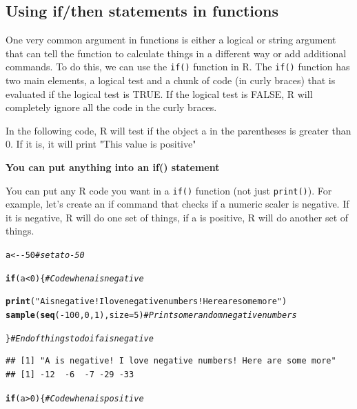 \documentclass{tufte-book}\usepackage[]{graphicx}\usepackage[]{color}
\makeatletter
\newcommand{\hlnum}[1]{\textcolor[rgb]{0.686,0.059,0.569}{#1}}%
\newcommand{\hlstr}[1]{\textcolor[rgb]{0.192,0.494,0.8}{#1}}%
\newcommand{\hlcom}[1]{\textcolor[rgb]{0.678,0.584,0.686}{\textit{#1}}}%
\newcommand{\hlopt}[1]{\textcolor[rgb]{0,0,0}{#1}}%
\newcommand{\hlstd}[1]{\textcolor[rgb]{0.345,0.345,0.345}{#1}}%
\newcommand{\hlkwa}[1]{\textcolor[rgb]{0.161,0.373,0.58}{\textbf{#1}}}%
\newcommand{\hlkwb}[1]{\textcolor[rgb]{0.69,0.353,0.396}{#1}}%
\newcommand{\hlkwc}[1]{\textcolor[rgb]{0.333,0.667,0.333}{#1}}%
\newcommand{\hlkwd}[1]{\textcolor[rgb]{0.737,0.353,0.396}{\textbf{#1}}}%
\newenvironment{kframe}{%
 \def\at@end@of@kframe{}%
 \ifinner\ifhmode%
  \def\at@end@of@kframe{\end{minipage}}%
  \begin{minipage}{\columnwidth}%
 \fi\fi%
 \def\FrameCommand##1{\hskip\@totalleftmargin \hskip-\fboxsep
 \colorbox{shadecolor}{##1}\hskip-\fboxsep
     \hskip-\linewidth \hskip-\@totalleftmargin \hskip\columnwidth}%
 \MakeFramed {\advance\hsize-\width
   \@totalleftmargin\z@ \linewidth\hsize
   \@setminipage}}%
 {\par\unskip\endMakeFramed%
 \at@end@of@kframe}
\newenvironment{knitrout}{}{} %
\makeatother
\begin{document}
\begin{footnotesize}
\subsection{Using if/then statements in functions}

One very common argument in functions is either a logical or string argument that can tell the function to calculate things in a different way or add additional commands. To do this, we can use the \texttt{if()} function in R. The \texttt{if()} function has two main elements, a logical test and a chunk of code (in curly braces) that is evaluated if the logical test is TRUE. If the logical test is FALSE, R will completely ignore all the code in the curly braces.

In the following code, R will test if the object a in the parentheses is greater than 0. If it is, it will print "This value is positive"

\begin{marginfigure}
\textbf{You can put anything into an if(){} statement}

You can put any R code you want in a \texttt{if()} function (not just \texttt{print()}). For example, let's create an if command that checks if a numeric scaler is negative. If it is negative, R will do one set of things, if a is positive, R will do another set of things.

\begin{tiny}
\begin{knitrout}
\color{fgcolor}\begin{kframe}
\begin{alltt}
\hlstd{a} \hlkwb{<-} \hlopt{-}\hlnum{50}  \hlcom{# set a to -50}

\hlkwa{if}\hlstd{(a} \hlopt{<} \hlnum{0}\hlstd{) \{} \hlcom{# Code when a is negative}

 \hlkwd{print}\hlstd{(}\hlstr{"A is negative! I love negative numbers! Here are some more"}\hlstd{)}
 \hlkwd{sample}\hlstd{(}\hlkwd{seq}\hlstd{(}\hlopt{-}\hlnum{100}\hlstd{,} \hlnum{0}\hlstd{,} \hlnum{1}\hlstd{),} \hlkwc{size} \hlstd{=} \hlnum{5}\hlstd{)} \hlcom{# Print some random negative numbers}

\hlstd{\}} \hlcom{# End of things to do if a is negative}
\end{alltt}
\begin{verbatim}
## [1] "A is negative! I love negative numbers! Here are some more"
## [1] -12  -6  -7 -29 -33
\end{verbatim}
\begin{alltt}
\hlkwa{if}\hlstd{(a} \hlopt{>} \hlnum{0}\hlstd{) \{} \hlcom{# Code when a is positive}


\end{alltt}
\end{kframe}
\end{knitrout}
\end{tiny}
\end{marginfigure}
\end{footnotesize}
\end{document}
